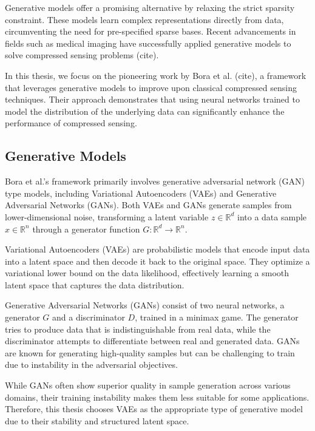 Generative models offer a promising alternative by relaxing the strict sparsity constraint.
These models learn complex representations directly from data, circumventing the need for pre-specified sparse bases.
Recent advancements in fields such as medical imaging have successfully applied generative models to solve compressed sensing problems (cite). %

In this thesis, we focus on the pioneering work by Bora et al. (cite), a framework that leverages generative models to improve upon classical compressed sensing techniques.
Their approach demonstrates that using neural networks trained to model the distribution of the underlying data can significantly enhance the performance of compressed sensing.

\subsection{Generative Models}

Bora et al.'s framework primarily involves generative adversarial network (GAN) type models, including Variational Autoencoders (VAEs) and Generative Adversarial Networks (GANs).
Both VAEs and GANs generate samples from lower-dimensional noise, transforming a latent variable $z \in \mathbb{R}^d$ into a data sample $x \in \mathbb{R}^n$ through a generator function $G: \mathbb{R}^d \to \mathbb{R}^n$.

Variational Autoencoders (VAEs) are probabilistic models that encode input data into a latent space and then decode it back to the original space.
They optimize a variational lower bound on the data likelihood, effectively learning a smooth latent space that captures the data distribution.

Generative Adversarial Networks (GANs) consist of two neural networks, a generator $G$ and a discriminator $D$, trained in a minimax game.
The generator tries to produce data that is indistinguishable from real data, while the discriminator attempts to differentiate between real and generated data.
GANs are known for generating high-quality samples but can be challenging to train due to instability in the adversarial objectives.

While GANs often show superior quality in sample generation across various domains, their training instability makes them less suitable for some applications.
Therefore, this thesis chooses VAEs as the appropriate type of generative model due to their stability and structured latent space.

